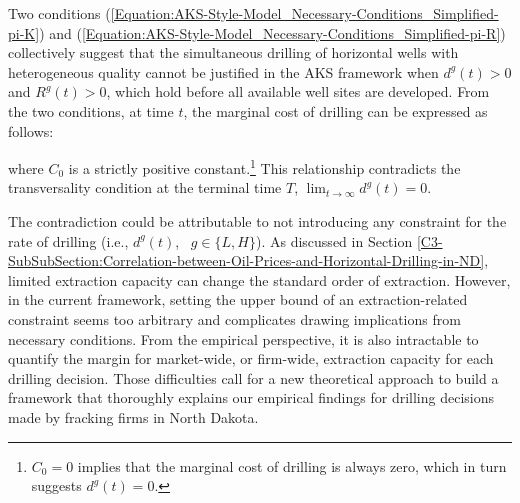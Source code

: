 Two conditions (\ref{Equation:AKS-Style-Model_Necessary-Conditions_Simplified-pi-K}) and (\ref{Equation:AKS-Style-Model_Necessary-Conditions_Simplified-pi-R}) collectively suggest that the simultaneous drilling of horizontal wells with heterogeneous quality cannot be justified in the AKS framework when $d^{g}(t) > 0$ and $R^{g}(t) > 0$, which hold before all available well sites are developed. From the two conditions, at time $t$, the marginal cost of drilling can be expressed as follows:

where $C_{0}$ is a strictly positive constant.\footnote{$C_{0} = 0$ implies that the marginal cost of drilling is always zero, which in turn suggests $d^{g}(t) = 0$.} This relationship contradicts the transversality condition at the terminal time $T$, $\lim_{t \to \infty}d^{g}(t) = 0$.

The contradiction could be attributable to not introducing any constraint for the rate of drilling (i.e., $d^{g}(t)$, \ $g \in \{ L, H \}$). As discussed in Section \ref{C3-SubSubSection:Correlation-between-Oil-Prices-and-Horizontal-Drilling-in-ND}, limited extraction capacity can change the standard order of extraction. However, in the current framework, setting the upper bound of an extraction-related constraint seems too arbitrary and complicates drawing implications from necessary conditions. From the empirical perspective, it is also intractable to quantify the margin for market-wide, or firm-wide, extraction capacity for each drilling decision. Those difficulties call for a new theoretical approach to build a framework that thoroughly explains our empirical findings for drilling decisions made by fracking firms in North Dakota. 
